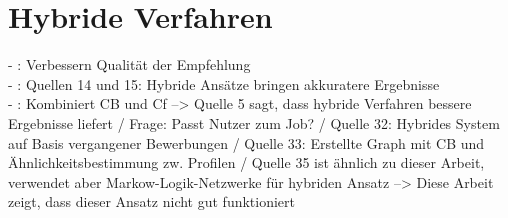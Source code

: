 \section{Hybride Verfahren}
\label{ch:standDerForschung:hybrideVerfahren}
- \cite{hybridImmunizing:2017}: Verbessern Qualität der Empfehlung \\
- \cite{dynamicUserProfile:2013}: Quellen 14 und 15: Hybride Ansätze bringen akkuratere Ergebnisse \\
- \cite{combiningCbAndCFCostSensitiveApproach:2017}: Kombiniert CB und Cf --> Quelle 5 sagt, dass hybride Verfahren bessere Ergebnisse liefert / Frage: Passt Nutzer zum Job? / Quelle 32: Hybrides System auf Basis vergangener Bewerbungen / Quelle 33: Erstellte Graph mit CB und Ähnlichkeitsbestimmung zw. Profilen / Quelle 35 ist ähnlich zu dieser Arbeit, verwendet aber Markow-Logik-Netzwerke für hybriden Ansatz --> Diese Arbeit zeigt, dass dieser Ansatz nicht gut funktioniert \\

